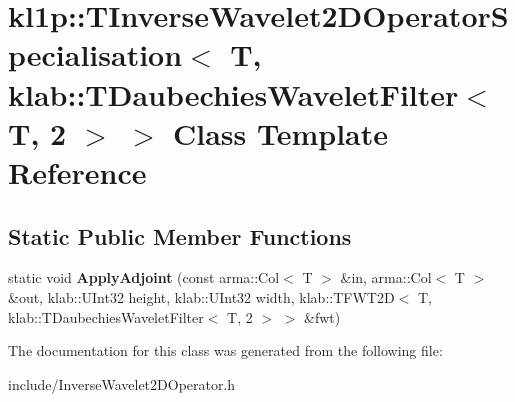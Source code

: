 \hypertarget{classkl1p_1_1TInverseWavelet2DOperatorSpecialisation_3_01T_00_01klab_1_1TDaubechiesWaveletFilter_3_01T_00_012_01_4_01_4}{}\section{kl1p\+:\+:T\+Inverse\+Wavelet2\+D\+Operator\+Specialisation$<$ T, klab\+:\+:T\+Daubechies\+Wavelet\+Filter$<$ T, 2 $>$ $>$ Class Template Reference}
\label{classkl1p_1_1TInverseWavelet2DOperatorSpecialisation_3_01T_00_01klab_1_1TDaubechiesWaveletFilter_3_01T_00_012_01_4_01_4}
\subsection*{Static Public Member Functions}
\begin{DoxyCompactItemize}
\item 
static void {\bfseries Apply\+Adjoint} (const arma\+::\+Col$<$ T $>$ \&in, arma\+::\+Col$<$ T $>$ \&out, klab\+::\+U\+Int32 height, klab\+::\+U\+Int32 width, klab\+::\+T\+F\+W\+T2D$<$ T, klab\+::\+T\+Daubechies\+Wavelet\+Filter$<$ T, 2 $>$ $>$ \&fwt)\hypertarget{classkl1p_1_1TInverseWavelet2DOperatorSpecialisation_3_01T_00_01klab_1_1TDaubechiesWaveletFilter_3_01T_00_012_01_4_01_4_add9dab02209cb165bafed11d7700d9e7}{}\label{classkl1p_1_1TInverseWavelet2DOperatorSpecialisation_3_01T_00_01klab_1_1TDaubechiesWaveletFilter_3_01T_00_012_01_4_01_4_add9dab02209cb165bafed11d7700d9e7}

\end{DoxyCompactItemize}


The documentation for this class was generated from the following file\+:\begin{DoxyCompactItemize}
\item 
include/Inverse\+Wavelet2\+D\+Operator.\+h\end{DoxyCompactItemize}
